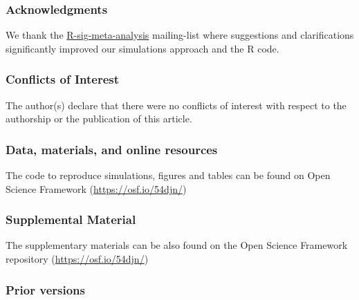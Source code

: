 \documentclass[
  man,floatsintext]{apa6}
\begin{document}
\newpage

\hypertarget{acknowledgments}{%
\subsubsection*{Acknowledgments}\label{acknowledgments}}

We thank the \href{https://stat.ethz.ch/mailman/listinfo/r-sig-meta-analysis}{R-sig-meta-analysis} mailing-list where suggestions and clarifications significantly improved our simulations approach and the R code.

\hypertarget{conflicts-of-interest}{%
\subsubsection*{Conflicts of Interest}\label{conflicts-of-interest}}

The author(s) declare that there were no conflicts of interest with respect to the authorship or the publication of this article.

\hypertarget{data-materials-and-online-resources}{%
\subsubsection*{Data, materials, and online resources}\label{data-materials-and-online-resources}}

The code to reproduce simulations, figures and tables can be found on Open Science Framework (\url{https://osf.io/54djn/})

\hypertarget{supplemental-material}{%
\subsubsection*{Supplemental Material}\label{supplemental-material}}

The supplementary materials can be also found on the Open Science Framework repository (\url{https://osf.io/54djn/})

\hypertarget{prior-versions}{%
\subsubsection*{Prior versions}\label{prior-versions}}
\end{document}
